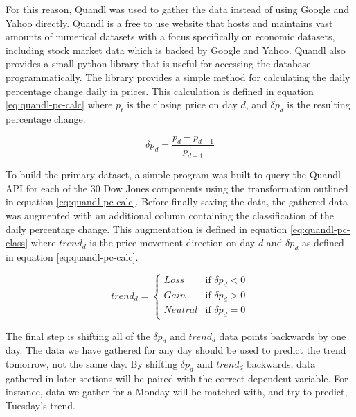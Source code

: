 \documentclass{report}
\begin{document}
For this reason, Quandl\cite{website:quandl} was used to gather the data instead of using Google and Yahoo directly. Quandl is a free to use website that hosts and maintains vast amounts of numerical datasets with a focus specifically on economic datasets, including stock market data which is backed by Google and Yahoo. Quandl also provides a small python library that is useful for accessing the database programmatically. The library provides a simple method for calculating the daily percentage change daily in prices. This calculation is defined in equation \ref{eq:quandl-pc-calc} where $p_{t}$ is the closing price on day $d$, and $\delta p_{d}$ is the resulting percentage change.  

\begin{figure}[H]
\begin{center}
    \begin{equation}
      \delta p_{d} = \dfrac{p_{d} - p_{d-1}} {p_{d-1}}
      \label{eq:quandl-pc-calc}
    \end{equation}
\end{center}
\end{figure}

To build the primary dataset, a simple program was built to query the Quandl API for each of the 30 Dow Jones components using the transformation outlined in equation \ref{eq:quandl-pc-calc}. Before finally saving the data, the gathered data was augmented with an additional column containing the classification of the daily percentage change. This augmentation is defined in equation \ref{eq:quandl-pc-class} where $trend_{d}$ is the price movement direction on day $d$ and $\delta p_{d}$ as defined in equation \ref{eq:quandl-pc-calc}.

\begin{figure}[H]
\begin{center}
\begin{equation}
trend_{d} = \begin{cases}
Loss &\text{if $\delta p_{d} < 0$}\\
Gain &\text{if $\delta p_{d} > 0$}\\
Neutral &\text{if $\delta p_{d} = 0$}
\end{cases}
\label{eq:quandl-pc-class}
\end{equation}
\end{center}
\end{figure}

The final step is shifting all of the $\delta p_{d}$ and $trend_{d}$ data points backwards by one day. The data we have gathered for any day should be used to predict the trend tomorrow, not the same day. By shifting $\delta p_{d}$ and $trend_{d}$ backwards, data gathered in later sections will be paired with the correct dependent variable. For instance, data we gather for a Monday will be matched with, and try to predict, Tuesday's trend.
\end{document}
